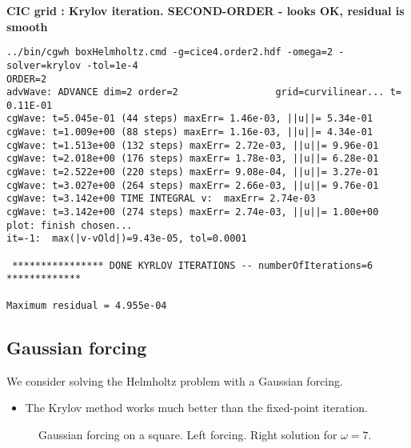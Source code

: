 \documentclass[preprint,11pt]{elsarticle}
\begin{document}
\bigskip
\textbf{CIC grid  : Krylov iteration. SECOND-ORDER  - looks OK, residual is smooth}
\begin{Verbatim}[fontsize=\scriptsize]
  ../bin/cgwh boxHelmholtz.cmd -g=cice4.order2.hdf -omega=2 -solver=krylov -tol=1e-4
ORDER=2
advWave: ADVANCE dim=2 order=2                 grid=curvilinear... t=  0.11E-01
cgWave: t=5.045e-01 (44 steps) maxErr= 1.46e-03, ||u||= 5.34e-01 
cgWave: t=1.009e+00 (88 steps) maxErr= 1.16e-03, ||u||= 4.34e-01 
cgWave: t=1.513e+00 (132 steps) maxErr= 2.72e-03, ||u||= 9.96e-01 
cgWave: t=2.018e+00 (176 steps) maxErr= 1.78e-03, ||u||= 6.28e-01 
cgWave: t=2.522e+00 (220 steps) maxErr= 9.08e-04, ||u||= 3.27e-01 
cgWave: t=3.027e+00 (264 steps) maxErr= 2.66e-03, ||u||= 9.76e-01 
cgWave: t=3.142e+00 TIME INTEGRAL v:  maxErr= 2.74e-03
cgWave: t=3.142e+00 (274 steps) maxErr= 2.74e-03, ||u||= 1.00e+00 
plot: finish chosen...
it=-1:  max(|v-vOld|)=9.43e-05, tol=0.0001

 **************** DONE KYRLOV ITERATIONS -- numberOfIterations=6 *************

Maximum residual = 4.955e-04
\end{Verbatim}




\clearpage
\subsection{Gaussian forcing} \label{sec:gaussianPulse}

We consider solving the Helmholtz problem with a Gaussian forcing. 

\begin{itemize}
  \item The Krylov method works much better than the fixed-point iteration.
\end{itemize}  

{%
%
\newcommand{\figWidth}{6cm}%
\newcommand{\trimfig}[2]{\trimhb{#1}{#2}{.0}{.0}{.0}{.0}}
\begin{figure}[htb]
\begin{center}
\end{center}
\caption{Gaussian forcing on a square. Left forcing. Right solution for $\omega=7$. }
  \label{fig:gaussianForcingSquare}
\end{figure}
}
\end{document}
